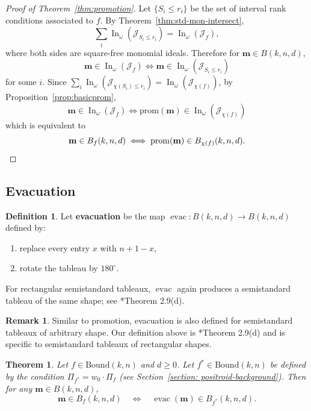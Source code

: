 \documentclass[12pt,reqno]{amsart}
\newtheorem{theorem}[lemma]{Theorem}
\theoremstyle{definition}
\newtheorem{definition}[lemma]{Definition}
\newtheorem{remark}[lemma]{Remark}
\newcommand{\inn}{\operatorname{In}}
\newcommand{\evac}
{\operatorname{evac}}
\newcommand{\mm}{\mathbf m}
\newcommand{\cJ}{\mathcal{J}}
\begin{document}
{\begin{proof}[Proof of Theorem~\ref{thm:promotion}] Let $\{S_i\leq r_i\}$ be the set of interval rank conditions associated to $f$. By Theorem~\ref{thm:std-mon-intersect},
\[\sum_{i}\inn_\omega(\cJ_{S_i\leq r_i}) = \inn_\omega(\cJ_f),\]
where both sides are square-free monomial ideals.
Therefore for $\mm\in B(k,n,d)$,
\[\mm\in \inn_\omega(\cJ_f)\iff \mm\in \inn_\omega(\cJ_{S_i\leq r_i})\]
for some $i$. Since $\sum_{i}\inn_\omega(\cJ_{\chi(S_i)\leq r_i}) = \inn_\omega(\cJ_{\chi(f)})$, by Proposition~\ref{prop:basicprom}, 
\[
\mm\in \inn_\omega(\cJ_f) \iff \mathrm{prom}(\mm)\in \inn_\omega(\cJ_{\chi(f)})\]
which is equivalent to
\[
\mm\in B_f(k,n,d) \iff \mathrm{prom}(\mm)\in B_{\chi(f)}(k,n,d).\qedhere\]
\end{proof}

\subsection{Evacuation}
\label{subsec:evacuation}
\begin{definition}\label{def:evac}
    Let \textbf{evacuation} be the map $\evac:B(k,n,d)\to B(k,n,d)$ defined by:
\begin{enumerate}
    \item replace every entry $x$ with $n+1-x$,
    \item rotate the tableau by $180^\circ$. 
\end{enumerate}
\end{definition}

For rectangular semistandard tableaux, \(\evac\) again produces a semistandard tableau of the same shape; see \cite{bloom2016proofs}*{Theorem 2.9(d)}.

\begin{remark}
    Similar to promotion, evacuation is also defined for semistandard tableaux of arbitrary shape. Our definition above is \cite{bloom2016proofs}*{Theorem 2.9(d)} and is specific to semistandard tableaux of rectangular shapes. 
\end{remark}

\begin{theorem}\label{thm:evac}
Let \(f\in \mathrm{Bound}(k,n)\) and \(d\ge 0\).
Let \(f^*\in \mathrm{Bound}(k,n)\) be defined by the condition
\(\Pi_{f^*}=w_0\cdot \Pi_f\) (see Section~\ref{section: positroid-background}).
Then for any \(\mm\in B(k,n,d)\),
\[
\mm\in B_f(k,n,d)\quad \Longleftrightarrow\quad \evac(\mm)\in B_{f^*}(k,n,d).
\]
\end{theorem}



}
\end{document}

